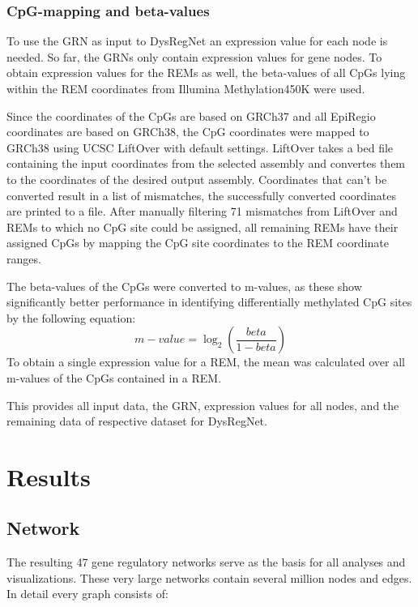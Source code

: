 \documentclass[pdftex,12pt,a4paper]{report}
\begin{document}
\subsection{CpG-mapping and beta-values}
To use the GRN as input to DysRegNet an expression value for each node is needed. So far, the GRNs only contain expression values for gene nodes. To obtain expression values for the REMs as well, the beta-values of all CpGs lying within the REM coordinates from Illumina Methylation450K\cite{methylation450} were used. 

Since the coordinates of the CpGs are based on GRCh37 and all EpiRegio coordinates are based on GRCh38, the CpG coordinates were mapped to GRCh38 using UCSC LiftOver with default settings\cite{liftover}. LiftOver takes a bed file containing the input coordinates from the selected assembly and convertes them to the coordinates of the desired output assembly. Coordinates that can't be converted result in a list of mismatches, the successfully converted coordinates are printed to a file. After manually filtering 71 mismatches from LiftOver and REMs to which no CpG site could be assigned, all remaining REMs have their assigned CpGs by mapping the CpG site coordinates to the REM coordinate ranges.

The beta-values of the CpGs were converted to m-values, as these show significantly better performance in identifying differentially methylated CpG sites\cite{mvalues} by the following equation:
\begin{equation}
	m-value = \log_{2}{(\frac{beta}{1-beta})}
\end{equation}
To obtain a single expression value for a REM, the mean was calculated over all m-values of the CpGs contained in a REM.

This provides all input data, the GRN, expression values for all nodes, and the remaining data of respective dataset for DysRegNet.

\chapter{Results}
\section{Network}
The resulting 47 gene regulatory networks serve as the basis for all analyses and visualizations. These very large networks contain several million nodes and edges. In detail every graph consists of:
\end{document}
